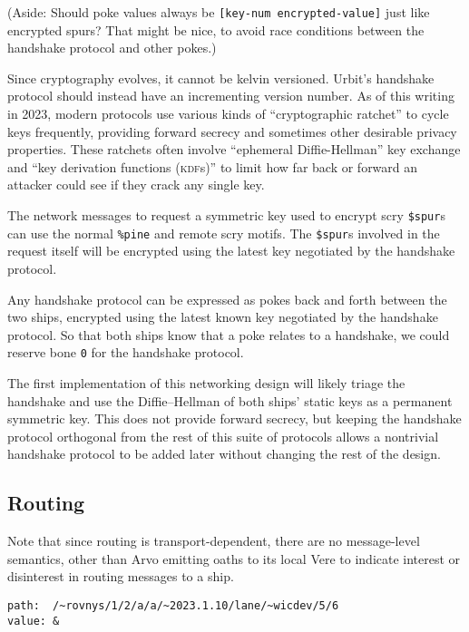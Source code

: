 \documentclass[twoside]{article}
\begin{document}
(Aside: Should poke values always be \lstinline[style=inlinecode]{[key-num encrypted-value]} just like encrypted spurs? That might be nice, to avoid race conditions between the handshake protocol and other pokes.)

Since cryptography evolves, it cannot be kelvin versioned. Urbit's handshake protocol should instead have an incrementing version number. As of this writing in 2023, modern protocols use various kinds of ``cryptographic ratchet'' to cycle keys frequently, providing forward secrecy and sometimes other desirable privacy properties. These ratchets often involve ``ephemeral Diffie-Hellman'' key exchange and ``key derivation functions (\textsc{kdf}s)'' to limit how far back or forward an attacker could see if they crack any single key.

The network messages to request a symmetric key used to encrypt scry \lstinline[style=inlinecode]{$spur}s can use the normal \lstinline[style=inlinecode]{%pine} and remote scry motifs. The \lstinline[style=inlinecode]{$spur}s involved in the request itself will be encrypted using the latest key negotiated by the handshake protocol.

Any handshake protocol can be expressed as pokes back and forth between the two ships, encrypted using the latest known key negotiated by the handshake protocol. So that both ships know that a poke relates to a handshake, we could reserve bone \lstinline[style=inlinecode]{0} for the handshake protocol.

The first implementation of this networking design will likely triage the handshake and use the Diffie–Hellman of both ships' static keys as a permanent symmetric key. This does not provide forward secrecy, but keeping the handshake protocol orthogonal from the rest of this suite of protocols allows a nontrivial handshake protocol to be added later without changing the rest of the design.

\subsection{Routing}

Note that since routing is transport-dependent, there are no message-level semantics, other than Arvo emitting oaths to its local Vere to indicate interest or disinterest in routing messages to a ship.

\begin{lstlisting}[style=listingcode]
path:  /~rovnys/1/2/a/a/~2023.1.10/lane/~wicdev/5/6
value: &
\end{lstlisting}
\end{document}

